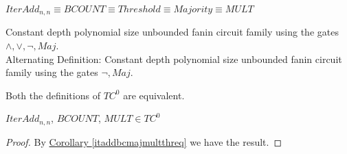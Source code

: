 \begin{corollary}\label{itaddbcmajmultthreq}
	$IterAdd_{n,n}\equiv BCOUNT\equiv Threshold \equiv Majority \equiv MULT$
\end{corollary}


\begin{definition}[$TC^0$]
	Constant depth polynomial size unbounded fanin circuit family using the gates $\wedge, \vee, \neg,Maj$.\\
	Alternating Definition: Constant depth polynomial size unbounded fanin circuit family using the gates $ \neg,Maj$.
\end{definition}
\begin{theorem}
	Both the definitions of $TC^0$ are equivalent.
\end{theorem}

\begin{theorem}
	$IterAdd_{n,n}$, $BCOUNT$, $MULT\in TC^0$
\end{theorem}
\begin{proof}
	By \hyperref[itaddbcmajmultthreq]{Corollary \ref{itaddbcmajmultthreq}} we have the result.
\end{proof}
